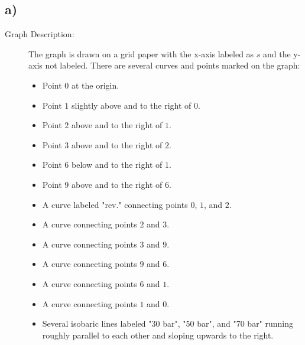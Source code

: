 

\subsection*{a)}

\begin{description}
    \item[Graph Description:] The graph is drawn on a grid paper with the x-axis labeled as $s$ and the y-axis not labeled. There are several curves and points marked on the graph:
    \begin{itemize}
        \item Point $0$ at the origin.
        \item Point $1$ slightly above and to the right of $0$.
        \item Point $2$ above and to the right of $1$.
        \item Point $3$ above and to the right of $2$.
        \item Point $6$ below and to the right of $1$.
        \item Point $9$ above and to the right of $6$.
        \item A curve labeled "rev." connecting points $0$, $1$, and $2$.
        \item A curve connecting points $2$ and $3$.
        \item A curve connecting points $3$ and $9$.
        \item A curve connecting points $9$ and $6$.
        \item A curve connecting points $6$ and $1$.
        \item A curve connecting points $1$ and $0$.
        \item Several isobaric lines labeled "30 bar", "50 bar", and "70 bar" running roughly parallel to each other and sloping upwards to the right.
    \end{itemize}
\end{description}
